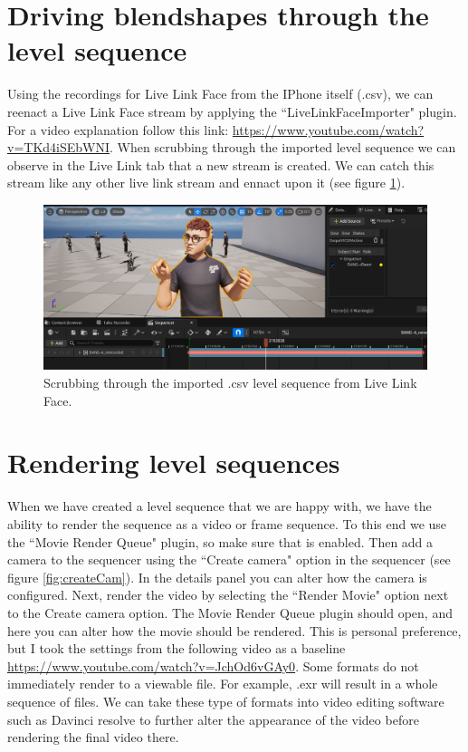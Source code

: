 \documentclass{uva-inf-article}
\begin{document}
\section{Driving blendshapes through the level sequence}
Using the recordings for Live Link Face from the IPhone itself (.csv), we can reenact a Live Link Face stream by applying the ``LiveLinkFaceImporter" plugin. For a video explanation follow this link: \url{https://www.youtube.com/watch?v=TKd4iSEbWNI}.
When scrubbing through the imported level sequence we can observe in the Live Link tab that a new stream is created. We can catch this stream like any other live link stream and ennact upon it (see figure \ref{fig:llfimporter}).
\begin{figure}[hbt!]
    \centering
    \includegraphics[width=.9\textwidth]{imgs/livelinkfaceimporter.png}
    \caption{Scrubbing through the imported .csv level sequence from Live Link Face.}
    \label{fig:llfimporter}
\end{figure}

\section{Rendering level sequences}
When we have created a level sequence that we are happy with, we have the ability to render the sequence as a video or frame sequence. To this end we use the ``Movie Render Queue" plugin, so make sure that is enabled. Then add a camera to the sequencer using the ``Create camera" option in the sequencer (see figure \ref{fig:createCam}). In the details panel you can alter how the camera is configured. Next, render the video by selecting the ``Render Movie" option next to the Create camera option. The Movie Render Queue plugin should open, and here you can alter how the movie should be rendered. This is personal preference, but I took the settings from the following video as a baseline \url{https://www.youtube.com/watch?v=JchOd6vGAy0}. Some formats do not immediately render to a viewable file. For example, .exr will result in a whole sequence of files. We can take these type of formats into video editing software such as Davinci resolve to further alter the appearance of the video before rendering the final video there.
\end{document}
